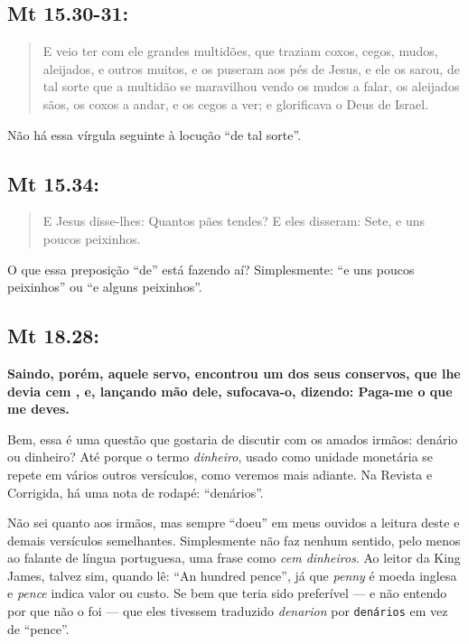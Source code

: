 \subsection*{Mt 15.30-31:}
\begin{quote} \small E veio ter com ele grandes multidões, que traziam coxos, cegos, mudos, aleijados, e outros muitos, e os puseram aos pés de Jesus, e ele os sarou, de tal sorte\uwave{,} que a multidão se maravilhou vendo os mudos a falar, os aleijados sãos, os coxos a andar, e os cegos a ver; e glorificava o Deus de Israel. \end{quote}

Não há essa vírgula seguinte à locução ``de tal sorte''.

\subsection*{Mt 15.34:}
\begin{quote}
 \small
 E Jesus disse-lhes: Quantos pães tendes? E eles disseram: Sete, e uns poucos  peixinhos.
\end{quote}

O que essa preposição ``de'' está fazendo aí? Simplesmente: ``e uns poucos peixinhos'' ou ``e alguns peixinhos''.

\subsection*{Mt 18.28:} \label{denario}
\textbf{Saindo, porém, aquele servo, encontrou um dos seus
conservos, que lhe devia cem , e, lançando mão dele, sufocava-o, dizendo: Paga-me o que me deves.}

Bem, essa é uma questão que gostaria de discutir com os amados irmãos:
denário ou dinheiro? Até porque o termo \emph{dinheiro}, usado como
unidade monetária se repete em vários outros versículos, como veremos
mais adiante. Na Revista e Corrigida, há uma nota de rodapé:
``denários''.

Não sei quanto aos irmãos, mas sempre ``doeu'' em meus ouvidos a
leitura deste e demais versículos semelhantes. Simplesmente não faz
nenhum sentido, pelo menos ao falante de língua portuguesa, uma frase
como \emph{cem dinheiros}. Ao leitor da King James, talvez sim, quando
lê: ``An hundred pence'', já que \emph{penny} é moeda inglesa e
\emph{pence} indica valor ou custo. Se bem que teria sido preferível
--- e não entendo por que não o foi --- que eles tivessem traduzido
\emph{denarion} por \texttt{denários} em vez de ``pence''.

